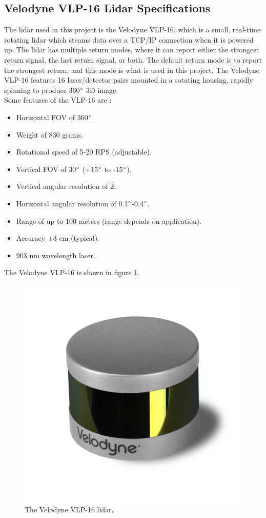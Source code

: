 \subsection{Velodyne VLP-16 Lidar Specifications}
The lidar used in this project is the Velodyne VLP-16, which is a small, real-time rotating lidar which steams data over a TCP/IP connection when it is powered up. The lidar has multiple return modes, where it can report either the strongest return signal, the last return signal, or both. The default return mode is to report the strongest return, and this mode is what is used in this project. The Velodyne VLP-16 features 16 laser/detector pairs mounted in a rotating housing, rapidly spinning to produce 360$\degree$ 3D image.\smallskip \\
Some features of the VLP-16 are \cite{velodyne_vlp16}:
\begin{itemize}
	\item Horizontal FOV of 360$\degree$.
	\item Weight of 830 grams.
	\item Rotational speed of 5-20 RPS (adjustable).
	\item Vertical FOV of 30$\degree$ (+15$\degree$ to -15$\degree$).
	\item Vertical angular resolution of 2\degree.
	\item Horizontal angular resolution of 0.1$\degree$-0.4$\degree$.
	\item Range of up to 100 meters (range depends on application).
	\item Accuracy $\pm3$ cm (typical).
	\item 903 nm wavelength laser.
\end{itemize}
The Velodyne VLP-16 is shown in figure \ref{fig:vlp_16}.
\begin{figure}[H]
	\centering
	\includegraphics[width=.4\linewidth]{fig/Velodyne_LiDAR_Puck_VLP-16_Left_900.png}
	\caption{The Velodyne VLP-16 lidar.}
	\label{fig:vlp_16}
\end{figure}
